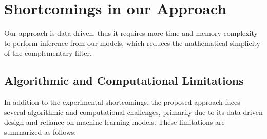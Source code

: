 \documentclass{iutbscthesis}
\begin{document}
\chapter{Shortcomings in our Approach}

Our approach is data driven, thus it requires more time and memory complexity to perform inference from our models, which reduces the mathematical simplicity of the complementary filter.

\section{Algorithmic and Computational Limitations}

In addition to the experimental shortcomings, the proposed approach faces several algorithmic and computational challenges, primarily due to its data-driven design and reliance on machine learning models. These limitations are summarized as follows:
\end{document}
